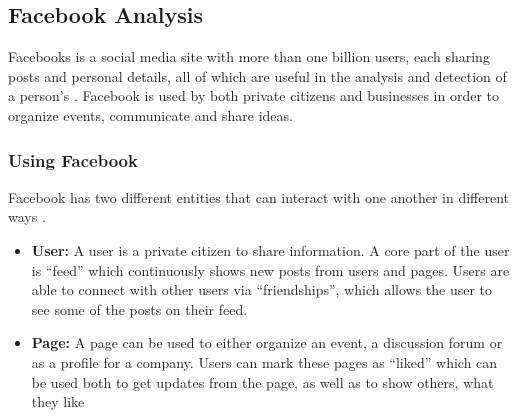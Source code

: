 \subsection{Facebook Analysis}\label{sec:facebook-analysis}
Facebooks is a social media site with more than one billion users, each
sharing posts and personal details, all of which are useful in the analysis and
detection of a person's \fbp. Facebook is used by both private citizens and
businesses in order to organize events, communicate and share ideas. 

\subsubsection{Using Facebook}
Facebook has two different entities that can interact with one another in
different ways \Source.

\begin{itemize}
  \item \textbf{User:} A user is a private citizen to share information. A core
  part of the user is ``feed'' which continuously shows new posts from users
  and pages. Users are able to connect with other users via ``friendships'',
  which allows the user to see some of the posts on their feed.
  \item \textbf{Page:} A page can be used to either organize an event, a
  discussion forum or as a profile for a company. Users can mark these pages as
  ``liked'' which can be used both to get updates from the page, as well as to
  show others, what they like
\end{itemize}

% 


